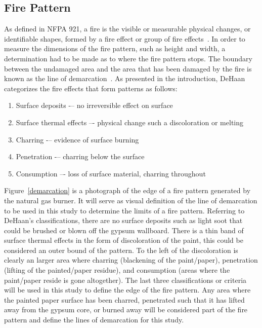 \documentclass[twoside]{uocthesis}
\begin{document}
\subsection{Fire Pattern}

As defined in NFPA 921, a fire is the visible or measurable physical changes, or identifiable shapes, formed by a fire effect or group of fire effects~\cite{NFPA_921}.  In order to measure the dimensions of the fire pattern, such as height and width, a determination had to be made as to where the fire pattern stops.  The boundary between the undamaged area and the area that has been damaged by the fire is known as the line of demarcation~\cite{NFPA_921}.  As presented in the introduction, DeHaan~\cite{DeHaan:2012} categorizes the fire effects that form patterns as follows:
\begin{enumerate}
	\item Surface deposits -– no irreversible effect on surface
	\item Surface thermal effects –- physical change such a discoloration or melting
	\item Charring -– evidence of surface burning
	\item Penetration -– charring below the surface
	\item Consumption –- loss of surface material, charring throughout
\end{enumerate}

Figure~\ref{demarcation} is a photograph of the edge of a fire pattern generated by the natural gas burner.  It will serve as visual definition of the line of demarcation to be used in this study to determine the limits of a fire pattern.  Referring to DeHaan's classifications, there are no surface deposits such as light soot that could be brushed or blown off the gypsum wallboard.  There is a thin band of surface thermal effects in the form of discoloration of the paint, this could be considered an outer bound of the pattern. To the left of the discoloration is clearly an larger area where charring (blackening of the paint/paper), penetration (lifting of the painted/paper residue), and consumption (areas where the paint/paper reside is gone altogether).  The last three classifications or criteria will be used in this study to define the edge of the fire pattern.  Any area where the painted paper surface has been charred, penetrated such that it has lifted away from the gypsum core, or burned away will be considered part of the fire pattern and define the lines of demarcation for this study.
\end{document}
